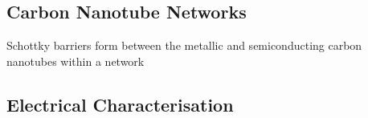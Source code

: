 \documentclass[
  a4paper,
]{scrbook}
\begin{document}
\hypertarget{carbon-nanotube-networks}{%
\subsection{Carbon Nanotube Networks}\label{carbon-nanotube-networks}}

Schottky barriers form between the metallic and semiconducting carbon
nanotubes within a network

\hypertarget{sec-electrical-characterisation-CNT}{%
\subsection{Electrical
Characterisation}\label{sec-electrical-characterisation-CNT}}

\begin{figure}

\begin{minipage}[t]{0.03\linewidth}

{\centering 


}

\end{minipage}%
%
\begin{minipage}[t]{0.01\linewidth}

{\centering 

~

}

\end{minipage}%
%
\begin{minipage}[t]{0.45\linewidth}

{\centering 

}
\end{minipage}
\end{figure}
\end{document}
